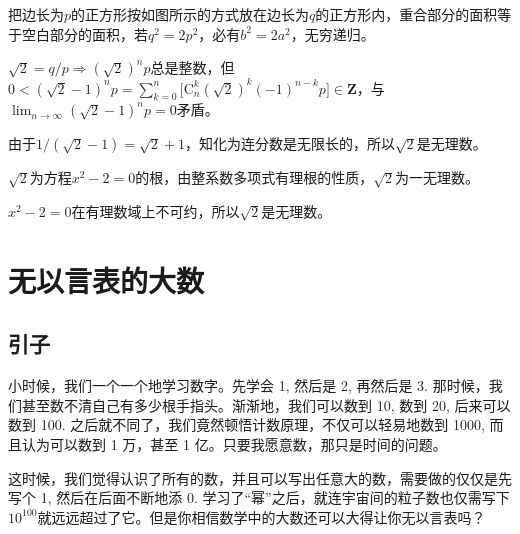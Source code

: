 \documentclass{article}
\theoremstyle{nonumberplain}\theorembodyfont{\normalfont}\theoremsymbol{$\Box$}
\begin{document}
\begin{minipage}{\textwidth}\begin{minipage}{0.6\textwidth}
把边长为$p$的正方形按如图所示的方式放在边长为$q$的正方形内，重合部分的面积等于空白部分的面积，若$q^2=2p^2$，必有$b^2=2a^2$，无穷递归。
\end{minipage}\quad\begin{minipage}{0.4\textwidth}
\end{minipage}\end{minipage}

\def\Crm{\mathrm{C}}\def\Zbf{\mathbf{Z}}
$\sqrt2=q/p \Rightarrow (\sqrt2)^np$总是整数，但$0<(\sqrt2-1)^np=\displaystyle\sum_{k=0}^n\big[\Crm_n^k(\sqrt2)^k(-1)^{n-k}p\big]\in\Zbf$，与$\displaystyle\lim_{n\to\infty}(\sqrt2-1)^np=0$矛盾。

由于$1/(\sqrt2-1)=\sqrt2+1$，知化为连分数是无限长的，所以$\sqrt2$是无理数。

$\sqrt2$为方程$x^2-2=0$的根，由整系数多项式有理根的性质，$\sqrt2$为一无理数。

$x^2-2=0$在有理数域上不可约，所以$\sqrt2$是无理数。


\section{无以言表的大数}
\subsection{引子}
小时候，我们一个一个地学习数字。先学会 1, 然后是 2, 再然后是 3. 那时候，我们甚至数不清自己有多少根手指头。渐渐地，我们可以数到 10, 数到 20, 后来可以数到 100. 之后就不同了，我们竟然顿悟计数原理，不仅可以轻易地数到 1000, 而且认为可以数到 1 万，甚至 1 亿。只要我愿意数，那只是时间的问题。

这时候，我们觉得认识了所有的数，并且可以写出任意大的数，需要做的仅仅是先写个 1, 然后在后面不断地添 0. 学习了“幂”之后，就连宇宙间的粒子数也仅需写下$10^100$就远远超过了它。但是你相信数学中的大数还可以大得让你无以言表吗？
\end{document}
